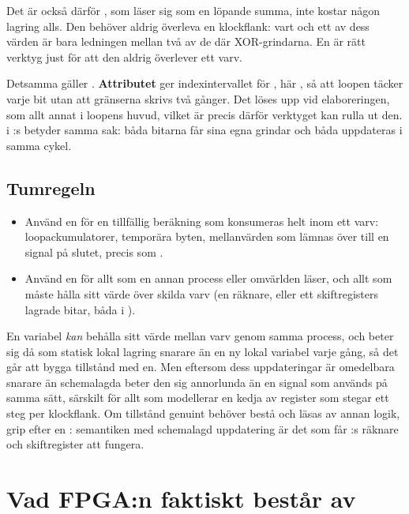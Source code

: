 Det är också därför , som läser sig som en löpande summa, inte kostar någon lagring alls.
Den behöver aldrig överleva en klockflank: vart och ett av dess värden är bara ledningen mellan två
av de där XOR-grindarna. En  är rätt verktyg just för att den aldrig överlever ett
varv.

Detsamma gäller . \textbf{Attributet}  ger indexintervallet för
, här , så att loopen täcker varje bit utan att gränserna skrivs två
gånger. Det löses upp vid elaboreringen, som allt annat i loopens huvud, vilket är precis därför
verktyget kan rulla ut den.  i :s 
betyder samma sak: båda bitarna får sina egna grindar och båda uppdateras i samma cykel.

\subsection*{Tumregeln}
\begin{itemize}
  \item Använd en  för en tillfällig beräkning som konsumeras helt inom ett varv:
    loopackumulatorer, temporära byten, mellanvärden som lämnas över till en signal på slutet,
    precis som .
  \item Använd en  för allt som en annan process eller omvärlden läser, och allt som
    måste hålla sitt värde över skilda varv (en räknare, eller ett skiftregisters lagrade bitar,
    båda i ).
\end{itemize}

En variabel \emph{kan} behålla sitt värde mellan varv genom samma process, och beter sig då som
statisk lokal lagring snarare än en ny lokal variabel varje gång, så det går att bygga tillstånd
med en. Men eftersom dess uppdateringar är omedelbara snarare än schemalagda beter den sig
annorlunda än en signal som används på samma sätt, särskilt för allt som modellerar en kedja av
register som stegar ett steg per klockflank. Om tillstånd genuint behöver bestå och läsas av annan
logik, grip efter en : semantiken med schemalagd uppdatering är det som får
:s räknare och skiftregister att fungera.

\section{Vad FPGA:n faktiskt består av}
\label{c5:sec:fabric}

